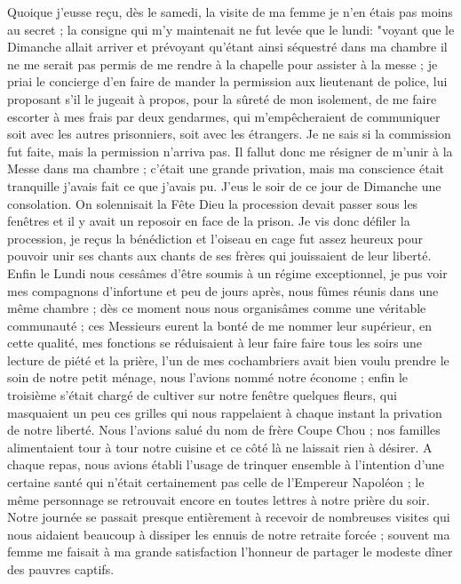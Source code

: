 \documentclass[11pt,a4paper]{report}
\begin{document}
Quoique j'eusse reçu, dès le samedi, la visite de ma femme je n'en étais pas moins au secret ; la consigne qui m'y maintenait ne fut levée que le lundi: "voyant que le Dimanche allait arriver et prévoyant qu'étant ainsi séquestré dans ma chambre il ne me serait pas permis de me rendre à la chapelle pour assister à la messe ; je priai le concierge d'en faire de mander la permission aux lieutenant de police, lui proposant s'il le jugeait à propos, pour la sûreté de mon isolement, de me faire escorter à mes frais par deux gendarmes, qui m'empêcheraient de communiquer soit avec les autres prisonniers, soit avec les étrangers. Je ne sais si la commission fut faite, mais la permission n'arriva pas. Il fallut donc me résigner de m'unir à la Messe dans ma chambre ; c'était une grande privation, mais ma conscience était tranquille j'avais fait ce que j'avais pu. J'eus le soir de ce jour de Dimanche une consolation. On solennisait la Fête Dieu la procession devait passer sous les fenêtres et il y avait un reposoir en face de la prison. Je vis donc défiler la procession, je reçus la bénédiction et l'oiseau en cage fut assez heureux pour pouvoir unir ses chants aux chants de ses frères qui jouissaient de leur liberté. Enfin le Lundi nous cessâmes d'être soumis à un régime exceptionnel, je pus voir mes compagnons d'infortune et peu de jours après, nous fûmes réunis dans une même chambre ; dès ce moment nous nous organisâmes comme une véritable communauté ; ces Messieurs eurent la bonté de me nommer leur supérieur, en cette qualité, mes fonctions se réduisaient à leur faire faire tous les soirs une lecture de piété et la prière, l'un de mes cochambriers avait bien voulu prendre le soin de notre petit ménage, nous l'avions nommé notre économe ; enfin le troisième s'était chargé de cultiver sur notre fenêtre quelques fleurs, qui masquaient un peu ces grilles qui nous rappelaient à chaque instant la privation de notre liberté. Nous l'avions salué du nom de frère Coupe Chou ; nos familles alimentaient tour à tour notre cuisine et ce côté là ne laissait rien à désirer. A chaque repas, nous avions établi l'usage de trinquer ensemble à l'intention d'une certaine santé qui n'était certainement pas celle de l'Empereur Napoléon ; le même personnage se retrouvait encore en toutes lettres à notre prière du soir. Notre journée se passait presque entièrement à recevoir de nombreuses visites qui nous aidaient beaucoup à dissiper les ennuis de notre retraite forcée ; souvent ma femme me faisait à ma grande satisfaction l'honneur de partager le modeste dîner des pauvres captifs.
\end{document}
